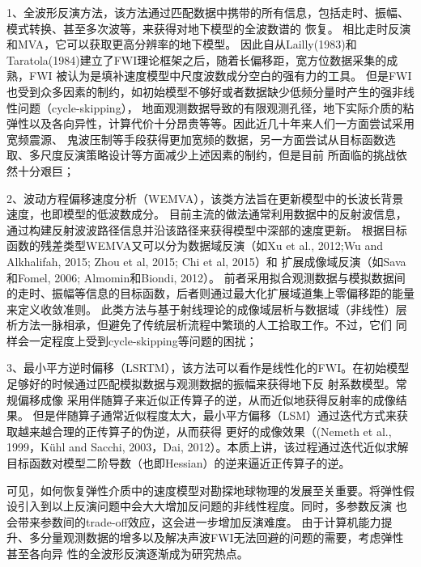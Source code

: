 1、全波形反演方法，该方法通过匹配数据中携带的所有信息，包括走时、振幅、模式转换、甚至多次波等，来获得对地下模型的全波数谱的
恢复。
相比走时反演和MVA，它可以获取更高分辨率的地下模型。
因此自从Lailly(1983)\cite{lailly1983seismic}和Taratola(1984)\cite{tarantola1984}建立了FWI理论框架之后，随着长偏移距，宽方位数据采集的成熟，FWI
被认为是填补速度模型中尺度波数成分空白的强有力的工具。
但是FWI也受到众多因素的制约，如初始模型不够好或者数据缺少低频分量时产生的强非线性问题（cycle-skipping），
地面观测数据导致的有限观测孔径，地下实际介质的粘弹性以及各向异性，计算代价十分昂贵等等。因此近几十年来人们一方面尝试采用宽频震源、
鬼波压制等手段获得更加宽频的数据，另一方面尝试从目标函数选取、多尺度反演策略设计等方面减少上述因素的制约，但是目前
所面临的挑战依然十分艰巨；

2、波动方程偏移速度分析（WEMVA），该类方法旨在更新模型中的长波长背景速度，也即模型的低波数成分。
目前主流的做法通常利用数据中的反射波信息，通过构建反射波波路径信息并沿该路径来获得模型中深部的速度更新。
根据目标函数的残差类型WEMVA又可以分为数据域反演（如Xu et al., 2012\cite{xu:2012};Wu and Alkhalifah,
2015\cite[]{Wu2015b}; Zhou et al, 
2015\cite[]{zhou:2015}; Chi et al, 2015\cite{chi2015}）和
扩展成像域反演（如Sava和Fomel, 2006\cite{Sava2006}; Almomin和Biondi, 2012\cite{Almomin2012}）。
前者采用拟合观测数据与模拟数据间的走时、振幅等信息的目标函数，后者则通过最大化扩展域道集上零偏移距的能量来定义收敛准则。
此类方法与基于射线理论的成像域层析与数据域（非线性）层析方法一脉相承，但避免了传统层析流程中繁琐的人工拾取工作。不过，它们
同样会一定程度上受到cycle-skipping等问题的困扰；

3、最小平方逆时偏移（LSRTM），该方法可以看作是线性化的FWI。在初始模型足够好的时候通过匹配模拟数据与观测数据的振幅来获得地下反
射系数模型。常规偏移成像
采用伴随算子来近似正传算子的逆，从而近似地获得反射率的成像结果。
但是伴随算子通常近似程度太大，最小平方偏移（LSM）通过迭代方式来获取越来越合理的正传算子的伪逆，从而获得
更好的成像效果（(Nemeth et al., 1999\cite{Nemeth1999}，Kühl and Sacchi\cite{KuehlEtAl2003}, 2003，Dai,
2012\cite{DaiEtAl2012}）。本质上讲，该过程通过迭代近似求解目标函数对模型二阶导数（也即Hessian）的逆来逼近正传算子的逆。

可见，如何恢复弹性介质中的速度模型对勘探地球物理的发展至关重要。将弹性假设引入到以上反演问题中会大大增加反问题的非线性程度。同时，多参数反演
也会带来参数间的trade-off效应，这会进一步增加反演难度。
由于计算机能力提升、多分量观测数据的增多以及解决声波FWI无法回避的问题的需要，考虑弹性甚至各向异
性的全波形反演逐渐成为研究热点。

